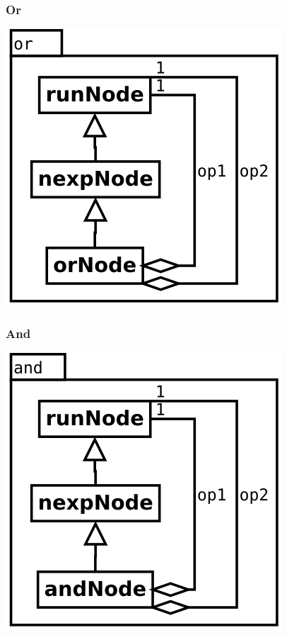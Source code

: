 \subsubsection {Or}
\begin{center}
\includegraphics[scale=0.4]{or.png} \\
\end{center}

\subsubsection {And}
\begin{center}
\includegraphics[scale=0.4]{and.png} \\
\end{center}

